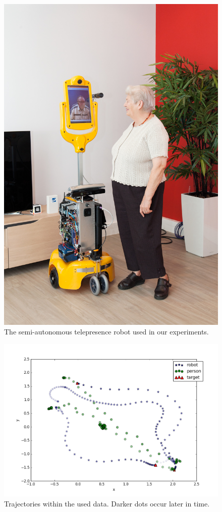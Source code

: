 \documentclass{aamas2016}
\begin{document}
\begin{figure}[t]     
  \centering
    \includegraphics[width=0.8\columnwidth]{images/robot.jpg}
  \caption{The semi-autonomous telepresence robot used in our experiments.}
  \label{fig:teresa_subject}
\end{figure}


\begin{figure}[t]     
  \centering
    \includegraphics[width=0.8\columnwidth]{images/data_plot.png}
  \caption{Trajectories within the used data. Darker dots occur later in time.}
  \label{fig:data}
\end{figure}
\end{document}
